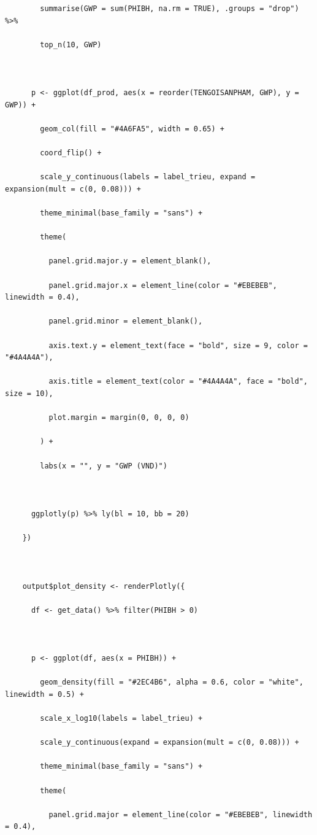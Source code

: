 \documentclass[12pt, a4paper]{article}
\begin{document}
\begin{lstlisting}
        summarise(GWP = sum(PHIBH, na.rm = TRUE), .groups = "drop") %>%

        top_n(10, GWP)



      p <- ggplot(df_prod, aes(x = reorder(TENGOISANPHAM, GWP), y = GWP)) +

        geom_col(fill = "#4A6FA5", width = 0.65) +

        coord_flip() +

        scale_y_continuous(labels = label_trieu, expand = expansion(mult = c(0, 0.08))) +

        theme_minimal(base_family = "sans") +

        theme(

          panel.grid.major.y = element_blank(),

          panel.grid.major.x = element_line(color = "#EBEBEB", linewidth = 0.4),

          panel.grid.minor = element_blank(),

          axis.text.y = element_text(face = "bold", size = 9, color = "#4A4A4A"),

          axis.title = element_text(color = "#4A4A4A", face = "bold", size = 10),

          plot.margin = margin(0, 0, 0, 0)

        ) +

        labs(x = "", y = "GWP (VND)")



      ggplotly(p) %>% ly(bl = 10, bb = 20)

    })



    output$plot_density <- renderPlotly({

      df <- get_data() %>% filter(PHIBH > 0)



      p <- ggplot(df, aes(x = PHIBH)) +

        geom_density(fill = "#2EC4B6", alpha = 0.6, color = "white", linewidth = 0.5) +

        scale_x_log10(labels = label_trieu) +

        scale_y_continuous(expand = expansion(mult = c(0, 0.08))) +

        theme_minimal(base_family = "sans") +

        theme(

          panel.grid.major = element_line(color = "#EBEBEB", linewidth = 0.4),


\end{lstlisting}
\end{document}
